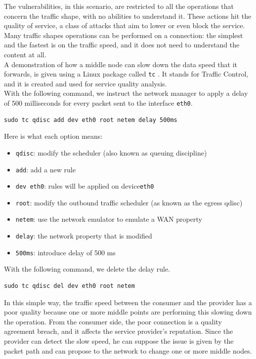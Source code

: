 \documentclass[12pt]{article}
\begin{document}
	The vulnerabilities, in this scenario, are restricted to all the operations that concern the traffic shape, with no abilities to understand it. These actions hit the quality of service, a class of attacks that aim to lower or even block the service.\\
	Many traffic shapes operations can be performed on a connection: the simplest and the fastest is on the traffic speed, and it does not need to understand the content at all.\\
	\bigbreak
	A demonstration of how a middle node can slow down the data speed that it forwards, is given using a Linux package called \lstinline{tc} \cite{tc}. It stands for Traffic Control, and it is created and used for service quality analysis.\\
	With the following command, we instruct the network manager to apply a delay of 500 milliseconds for every packet sent to the interface \lstinline{eth0}.\\
	
	\begin{lstlisting}[frame=single]
		sudo tc qdisc add dev eth0 root netem delay 500ms
	\end{lstlisting}
	
	Here is what each option means:
	\begin{itemize}
		\item \lstinline{qdisc}: modify the scheduler (also known as queuing discipline)
		\item \lstinline{add}: add a new rule
		\item \lstinline{dev eth0}: rules will be applied on device\lstinline{eth0}
		\item \lstinline{root}: modify the outbound traffic scheduler (as known as the egress qdisc)
		\item \lstinline{netem}: use the network emulator to emulate a WAN property
		\item \lstinline{delay}: the network property that is modified
		\item \lstinline{500ms}: introduce delay of 500 ms
	\end{itemize}

	With the following command, we delete the delay rule.\\

	\begin{lstlisting}[frame=single]
		sudo tc qdisc del dev eth0 root netem
	\end{lstlisting}

	In this simple way, the traffic speed between the consumer and the provider has a poor quality because one or more middle points are performing this slowing down the operation. From the consumer side, the poor connection is a quality agreement breach, and it affects the service provider's reputation. Since the provider can detect the slow speed, he can suppose the issue is given by the packet path and can propose to the network to change one or more middle nodes. 
\end{document}
